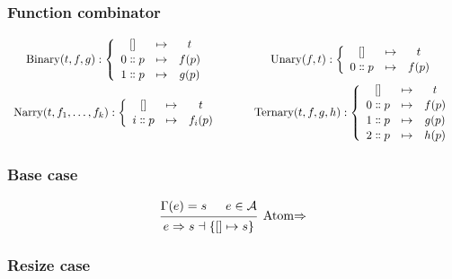 \documentclass{article}
\DeclareMathOperator{\Binary}{Binary}
\DeclareMathOperator{\Unary}{Unary}
\DeclareMathOperator{\Ternary}{Ternary}
\DeclareMathOperator{\Narry}{Narry}
\renewcommand{\S}{\ensuremath{\Rightarrow}}
\newcommand{\s}[3]{#1 \S{} #2 \dashv{} #3}
\begin{document}
\subsubsection*{Function combinator}
\begin{equation*}
	\renewcommand\arraystretch{1.1}
	\begin{array}{ccc}
		\Binary(t, f, g) : \left\{
		\begin{array}{ccc}
			{[]}          & \mapsto & t     \\
			0 \dblcolon p & \mapsto & f (p) \\
			1 \dblcolon p & \mapsto & g (p)
		\end{array}
		\right.
		 & \hspace{1em} &
		\Unary(f, t) : \left\{
		\begin{array}{ccc}
			{[]}          & \mapsto & t     \\
			0 \dblcolon p & \mapsto & f (p)
		\end{array}
		\right.
		\\
		\Narry(t, f_1, \dots, f_k) : \left\{
		\begin{array}{ccc}
			{[]}          & \mapsto & t       \\
			i \dblcolon p & \mapsto & f_i (p)
		\end{array}
		\right.
		 & \hspace{1em} &
		\Ternary(t, f, g, h) : \left\{
		\begin{array}{ccc}
			{[]}          & \mapsto & t     \\
			0 \dblcolon p & \mapsto & f (p) \\
			1 \dblcolon p & \mapsto & g (p) \\
			2 \dblcolon p & \mapsto & h (p)
		\end{array}
		\right.
	\end{array}
\end{equation*}

\subsubsection*{Base case}

\begin{equation*}
	\begin{prooftree}
		\hypo{\Gamma(e) = s}
		\hypo{e \in \mathcal{A}}
		\infer2[Atom\S]{\s{e}{s}{\{[]\mapsto s\}}}
	\end{prooftree}
\end{equation*}


\subsubsection*{Resize case}
\end{document}
